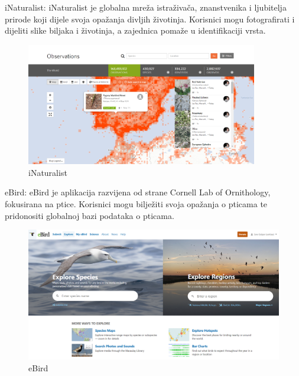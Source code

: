 		\begin{packed_item}
			\item iNaturalist: iNaturalist je globalna mreža istraživača, znanstvenika i ljubitelja prirode koji dijele svoja opažanja divljih životinja. Korisnici mogu fotografirati i dijeliti slike biljaka i životinja, a zajednica pomaže u identifikaciji vrsta. 
			
			\begin{figure}[H]
				\centering
				\includegraphics[width=0.9\textwidth]{slike/inaturalist.PNG}
				\caption{iNaturalist}
				\label{fig:inaturalist}
			\end{figure}
			
			
			\item eBird: eBird je aplikacija razvijena od strane Cornell Lab of Ornithology, fokusirana na ptice. Korisnici mogu bilježiti svoja opažanja o pticama te pridonositi globalnoj bazi podataka o pticama.
			\begin{figure}[H]
				\includegraphics[width=\textwidth]{slike/ebird.PNG} %
				\caption{eBird}
				\label{fig:ebird} %
			\end{figure}
			\item 
			

\end{packed_item}
